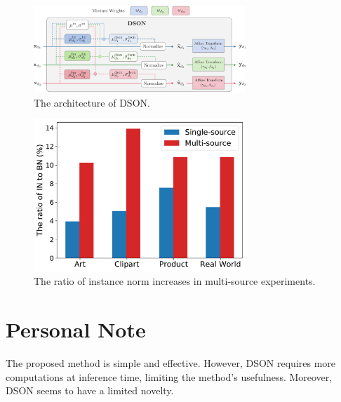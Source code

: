 \documentclass[10pt,twocolumn,letterpaper]{article}
\begin{document}
\begin{figure}[h]
	\centering
	\includegraphics[width=8cm]{assets/DSON.pdf}
	\caption{The architecture of DSON.}
	\label{fig:imgs}
\end{figure}

\begin{figure}[t]
	\centering
	\includegraphics[width=8cm]{assets/in_office.pdf}
	\caption{The ratio of instance norm increases in multi-source experiments.}
	\label{fig:imgs2}
\end{figure}

\section{Personal Note}
The proposed method is simple and effective. However, DSON requires more computations at inference time, limiting the method's usefulness. Moreover, DSON seems to have a limited novelty.
\end{document}
